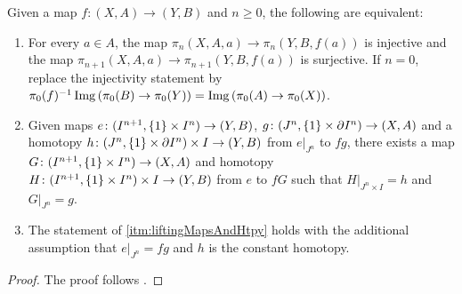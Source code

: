 \begin{prop}\label{prop:eqCharInjSurj}
    Given a map $f\colon(X,A)\to (Y,B)$ and $n\geq0$, the following are equivalent:
    \begin{enumerate}[label={(\roman*)}]
        \item For every $a\in A$, the map $\pi_n(X,A,a)\to \pi_n(Y,B,f(a))$ is injective and the map $\pi_{n+1}(X,A,a)\to \pi_{n+1}(Y,B,f(a))$ is surjective.
            If $n=0$, replace the injectivity statement by $\pi_0(f)^{-1}\operatorname{Img}\left(\pi_0(B)\to\pi_0(Y)\right)=\operatorname{Img}\left(\pi_0(A)\to\pi_0(X)\right)$. \label{itm:injAndSurjOfHtpyGrps}
        \item Given maps $e\colon(I^{n+1},\left\lbrace1\right\rbrace\times I^n)\to (Y,B)$, $g\colon(J^n,\left\lbrace1\right\rbrace\times\partial I^n)\to(X,A)$ and a homotopy $h\colon(J^n,\left\lbrace1\right\rbrace\times\partial I^n)\times I\to(Y,B)$ from $e|_{J^n}$ to $fg$, there exists a map $G\colon(I^{n+1},\left\lbrace1\right\rbrace\times I^n)\to(X,A)$ and homotopy $H\colon(I^{n+1},\left\lbrace1\right\rbrace\times I^n)\times I\to(Y,B)$ from $e$ to $fG$ such that $H|_{J^n\times I}=h$ and $G|_{J^n}=g$. \label{itm:liftingMapsAndHtpy} 
        \begin{center}
            \begin{adjustbox}{width=\linewidth}
            \end{adjustbox}        
        \end{center}
        \item The statement of \ref{itm:liftingMapsAndHtpy} holds with the additional assumption that $e|_{J^n}=fg$ and $h$ is the constant homotopy. \label{itm:liftingMapsAndHtpyConst}
    \end{enumerate}
    \begin{proof}
        The proof follows \cite[Lemma 3.3]{may1990weak}.


\end{proof}
\end{prop}
